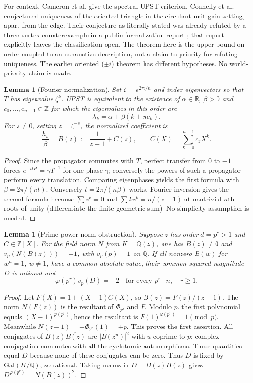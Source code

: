 \documentclass[10pt]{article}
\newtheorem{lemma}[theorem]{Lemma}
\newcommand{\ZZ}{\mathbb Z}\newcommand{\QQ}{\mathbb Q}
\begin{document}
For context, Cameron et al. \cite{cameron} give the spectral
UPST criterion. Connelly et al. \cite[Sec.~8]{connelly} conjectured
uniqueness of the oriented triangle in the circulant unit-gain setting,
apart from the edge. Their conjecture as literally stated was already
refuted by a three-vertex counterexample in a public formalization report
\cite{truth}; that report explicitly leaves the classification open.
The theorem here is the upper bound on order coupled to an exhaustive
description, not a claim to priority for refuting uniqueness.
The earlier oriented ($\pm i$) theorem \cite{complex} has different
hypotheses. No world-priority claim is made.

\begin{lemma}[Fourier normalization]\label{lem:fourier}
Set $\zeta=e^{2\pi i/n}$ and index eigenvectors so that $T$ has eigenvalue $\zeta^k$.
UPST is equivalent to the existence of $\alpha\in\mathbb R$, $\beta>0$ and
$c_0,\ldots,c_{n-1}\in\ZZ$ for which the eigenvalues in this order are
\[
 \lambda_k=\alpha+\beta(k+n c_k).
\]
For $s\ne0$, setting $z=\zeta^{-s}$, the normalized coefficient is
\[
 \frac{h_s}{\beta}=B(z):=\frac1{z-1}+C(z),\qquad C(X)=\sum_{k=0}^{n-1} c_kX^k.
\]
\end{lemma}
\begin{proof}
Since the propagator commutes with $T$, perfect transfer from $0$ to $-1$
forces $e^{-itH}=\gamma T^{-1}$ for one phase $\gamma$; conversely the powers
of such a propagator perform every translation.
Comparing eigenphases yields the first formula with
$\beta=2\pi/(nt)$. Conversely $t=2\pi/(n\beta)$ works.
Fourier inversion gives the second formula because $\sum z^k=0$ and
$\sum k z^k=n/(z-1)$ at nontrivial $n$th roots of unity (differentiate
the finite geometric sum). No simplicity assumption is needed.
\end{proof}

\begin{lemma}[Prime-power norm obstruction]\label{lem:norm}
Suppose $z$ has order $d=p^r>1$ and $C\in\ZZ[X]$.
For the field norm $N$ from $K=\QQ(z)$, one has $B(z)\ne0$ and
$v_p(N(B(z)))=-1$, with $v_p(p)=1$ on $\QQ$.
If all nonzero $B(w)$ for $w^n=1$, $w\ne1$, have a common absolute value, their common squared magnitude $D$ is rational and
\[
  \varphi(p^r)v_p(D)=-2
       \quad\text{for every }p^r\mid n,\quad r\ge1.
\]
\end{lemma}
\begin{proof}
Let $F(X)=1+(X-1)C(X)$, so $B(z)=F(z)/(z-1)$.
The norm $N(F(z))$ is the resultant of $\Phi_{p^r}$ and $F$.
Modulo $p$, the first polynomial equals $(X-1)^{\varphi(p^r)}$, hence
the resultant is $F(1)^{\varphi(p^r)}=1\pmod p$.
Meanwhile $N(z-1)=\pm\Phi_{p^r}(1)=\pm p$.
This proves the first assertion.
All conjugates of $B(z)\overline{B(z)}$ are $|B(z^u)|^2$ with $u$ coprime to $p$:
complex conjugation commutes with all the cyclotomic automorphisms.
These quantities equal $D$ because none of these conjugates can be zero.
Thus $D$ is fixed by $\mathrm{Gal}(K/\QQ)$, so rational. Taking norms
in $D=B(z)\overline{B(z)}$ gives $D^{\varphi(p^r)}=N(B(z))^2$.
\end{proof}
\end{document}
